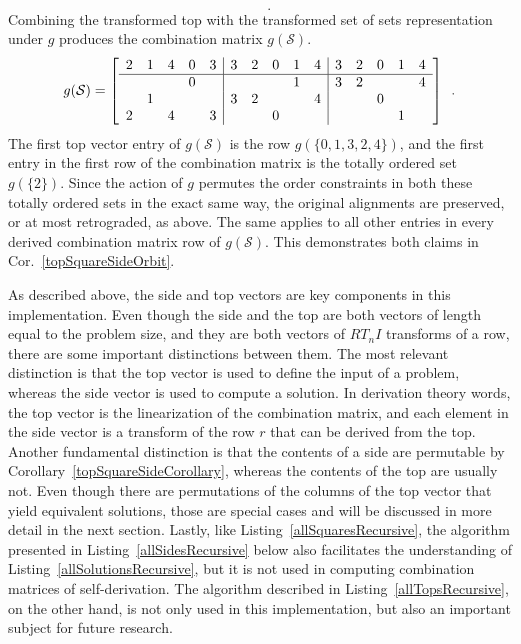 \begin{example}
\begin{equation}
\begin{split}
	\end{split} \enspace .
	\end{equation}
	Combining the transformed top with the transformed set of sets representation under $g$ produces the combination matrix $g(\mathcal{S})$.
	\begin{equation}
    	g(\mathcal{S}) = \left[
    	\begin{array}{ccccc|ccccc|ccccc}
        	2 & 1 & 4 & 0 & 3 & 3 & 2 & 0 & 1 & 4 & 3 & 2 & 0 & 1 & 4 \\
        	\hline
        	&&& 0 &&&&& 1 && 3 & 2 &&& 4 \\
        	& 1 &&&& 3 & 2 &&& 4 &&& 0 && \\
        	2 && 4 && 3 &&& 0 &&&&&& 1 &
    	\end{array}
    	\right] \enspace.
	\end{equation}
	The first top vector entry of $g(\mathcal{S})$ is the row $g(\{0, 1, 3, 2, 4\})$, and the first entry in the first row of the combination matrix is the totally ordered set $g(\{2\})$. Since the action of $g$ permutes the order constraints in both these totally ordered sets in the exact same way, the original alignments are preserved, or at most retrograded, as above. The same applies to all other entries in every derived combination matrix row of $g(\mathcal{S})$. This demonstrates both claims in Cor.~\ref{topSquareSideOrbit}.
\end{example}

As described above, the side and top vectors are key components in this implementation. Even though the side and the top are both vectors of length equal to the problem size, and they are both vectors of $RT_nI$ transforms of a row, there are some important distinctions between them. The most relevant distinction is that the top vector is used to define the input of a problem, whereas the side vector is used to compute a solution. In derivation theory words, the top vector is the linearization of the combination matrix, and each element in the side vector is a transform of the row $r$ that can be derived from the top. Another fundamental distinction is that the contents of a side are permutable by Corollary~\ref{topSquareSideCorollary}, whereas the contents of the top are usually not. Even though there are permutations of the columns of the top vector that yield equivalent solutions, those are special cases and will be discussed in more detail in the next section. Lastly, like Listing~\ref{allSquaresRecursive}, the algorithm presented in Listing~\ref{allSidesRecursive} below also facilitates the understanding of Listing~\ref{allSolutionsRecursive}, but it is not used in computing combination matrices of self-derivation. The algorithm described in Listing~\ref{allTopsRecursive}, on the other hand, is not only used in this implementation, but also an important subject for future research.

